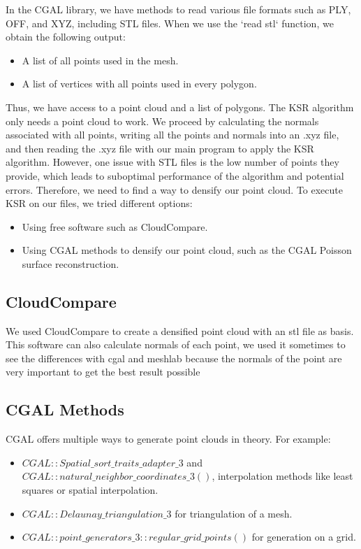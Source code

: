\documentclass{article}
\begin{document}
In the CGAL library, we have methods to read various file formats such as PLY, OFF, and XYZ, including STL files. When we use the `read stl` function, we obtain the following output:

\begin{itemize}
  \item A list of all points used in the mesh.
  \item A list of vertices with all points used in every polygon.
\end{itemize}

Thus, we have access to a point cloud and a list of polygons. The KSR algorithm only needs a point cloud to work. We proceed by calculating the normals associated with all points, 
writing all the points and normals into an .xyz file, and then reading the .xyz file with our main program to apply the KSR algorithm.
However, one issue with STL files is the low number of points they provide, which leads to suboptimal performance of the algorithm and potential errors. Therefore, we need to find a way to densify our point cloud.
To execute KSR on our files, we tried different options:

\begin{itemize}
  \item Using free software such as CloudCompare.
  \item Using CGAL methods to densify our point cloud, such as the CGAL Poisson surface reconstruction.
\end{itemize}

\subsection{CloudCompare}
We used CloudCompare to create a densified point cloud with an stl file as basis.
This software can also calculate normals of each point, we used it sometimes to 
see the differences with cgal and meshlab because the normals of the point are very important to get the best result possible 

\subsection{CGAL Methods}
CGAL offers multiple ways to generate point clouds in theory. For example:

\begin{itemize}
  \item $CGAL::Spatial\_sort\_traits\_adapter\_3$ and $CGAL::natural\_neighbor\_coordinates\_3()$, interpolation methods like least squares or spatial interpolation.
  \item $CGAL::Delaunay\_triangulation\_3$ for triangulation of a mesh.
  \item $CGAL::point\_generators\_3::regular\_grid\_points()$ for generation on a grid.
\end{itemize}
\end{document}
